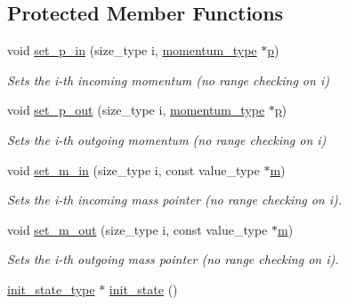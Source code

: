 \subsection*{Protected Member Functions}
\begin{DoxyCompactItemize}
\item 
\hypertarget{a00441_a45c1e9624f89e3d61d9559a7f415ad02}{void \hyperlink{a00441_a45c1e9624f89e3d61d9559a7f415ad02}{set\-\_\-p\-\_\-in} (size\-\_\-type i, \hyperlink{a00559}{momentum\-\_\-type} $\ast$\hyperlink{a00441_ac25aaa44a2bde95d582aac52f85fdfdf}{p})}\label{a00441_a45c1e9624f89e3d61d9559a7f415ad02}

\begin{DoxyCompactList}\small\item\em Sets the i-\/th incoming momentum (no range checking on i) \end{DoxyCompactList}\item 
\hypertarget{a00441_a492347db4ed4e67d34bd0f06f3f0b516}{void \hyperlink{a00441_a492347db4ed4e67d34bd0f06f3f0b516}{set\-\_\-p\-\_\-out} (size\-\_\-type i, \hyperlink{a00559}{momentum\-\_\-type} $\ast$\hyperlink{a00441_ac25aaa44a2bde95d582aac52f85fdfdf}{p})}\label{a00441_a492347db4ed4e67d34bd0f06f3f0b516}

\begin{DoxyCompactList}\small\item\em Sets the i-\/th outgoing momentum (no range checking on i) \end{DoxyCompactList}\item 
\hypertarget{a00441_ab780bbfe111a895c3ce8d39838b0f937}{void \hyperlink{a00441_ab780bbfe111a895c3ce8d39838b0f937}{set\-\_\-m\-\_\-in} (size\-\_\-type i, const value\-\_\-type $\ast$\hyperlink{a00442_a3a9390d5b0f36b7778161963c43843b0}{m})}\label{a00441_ab780bbfe111a895c3ce8d39838b0f937}

\begin{DoxyCompactList}\small\item\em Sets the i-\/th incoming mass pointer (no range checking on i). \end{DoxyCompactList}\item 
\hypertarget{a00441_ae04f7eebaa9e1423f234ee12aeef49bd}{void \hyperlink{a00441_ae04f7eebaa9e1423f234ee12aeef49bd}{set\-\_\-m\-\_\-out} (size\-\_\-type i, const value\-\_\-type $\ast$\hyperlink{a00442_a3a9390d5b0f36b7778161963c43843b0}{m})}\label{a00441_ae04f7eebaa9e1423f234ee12aeef49bd}

\begin{DoxyCompactList}\small\item\em Sets the i-\/th outgoing mass pointer (no range checking on i). \end{DoxyCompactList}\item 
\hypertarget{a00441_a2747dd61ee5bf952f42f5629fa9b3960}{\hyperlink{a00304}{init\-\_\-state\-\_\-type} $\ast$ \hyperlink{a00441_a2747dd61ee5bf952f42f5629fa9b3960}{init\-\_\-state} ()}\label{a00441_a2747dd61ee5bf952f42f5629fa9b3960}


\end{DoxyCompactItemize}

